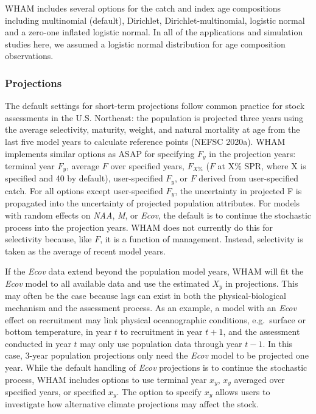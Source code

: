 \documentclass[]{article}
\begin{document}
WHAM includes several options for the catch and index age compositions
including multinomial (default), Dirichlet, Dirichlet-multinomial,
logistic normal and a zero-one inflated logistic normal. In all of the
applications and simulation studies here, we assumed a logistic normal
distribution for age composition observations.

\hypertarget{projections}{%
\subsubsection{Projections}\label{projections}}

The default settings for short-term projections follow common practice
for stock assessments in the U.S. Northeast: the population is projected
three years using the average selectivity, maturity, weight, and natural
mortality at age from the last five model years to calculate reference
points (NEFSC 2020a). WHAM implements similar options as ASAP for
specifying \(F_y\) in the projection years: terminal year \(F_y\),
average \(F\) over specified years, \(F_{X\%}\) (\(F\) at X\% SPR, where
X is specified and 40 by default), user-specified \(F_y\), or \(F\)
derived from user-specified catch. For all options except user-specified
\(F_y\), the uncertainty in projected F is propagated into the
uncertainty of projected population attributes. For models with random
effects on \emph{NAA}, \emph{M}, or \emph{Ecov}, the default is to
continue the stochastic process into the projection years. WHAM does not
currently do this for selectivity because, like \(F\), it is a function
of management. Instead, selectivity is taken as the average of recent
model years.

If the \emph{Ecov} data extend beyond the population model years, WHAM
will fit the \emph{Ecov} model to all available data and use the
estimated \(X_y\) in projections. This may often be the case because
lags can exist in both the physical-biological mechanism and the
assessment process. As an example, a model with an \emph{Ecov} effect on
recruitment may link physical oceanographic conditions, e.g.~surface or
bottom temperature, in year \(t\) to recruitment in year \(t+1\), and
the assessment conducted in year \(t\) may only use population data
through year \(t-1\). In this case, 3-year population projections only
need the \emph{Ecov} model to be projected one year. While the default
handling of \emph{Ecov} projections is to continue the stochastic
process, WHAM includes options to use terminal year \(x_y\), \(x_y\)
averaged over specified years, or specified \(x_y\). The option to
specify \(x_y\) allows users to investigate how alternative climate
projections may affect the stock.
\end{document}
